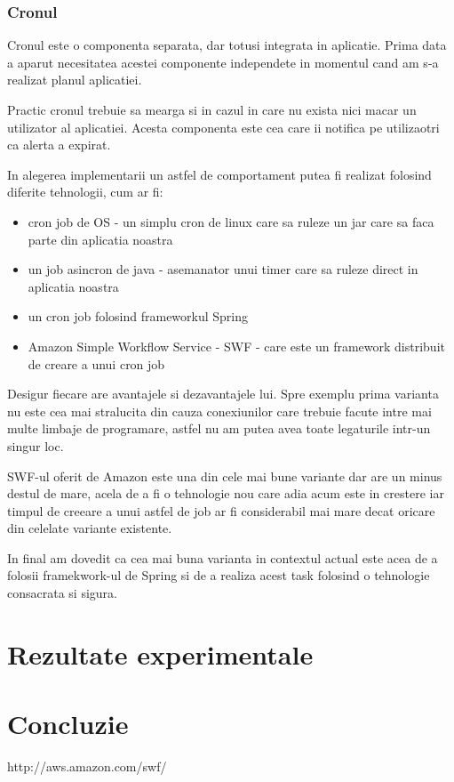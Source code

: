 \documentclass[conference]{IEEEtran}
\begin{document}
\subsubsection{Cronul}

Cronul este o componenta separata, dar totusi integrata in aplicatie. Prima data a aparut necesitatea acestei componente independete in momentul cand am s-a realizat planul aplicatiei. 

Practic cronul trebuie sa mearga si in cazul in care nu exista nici macar un utilizator al aplicatiei. Acesta componenta este cea care ii notifica pe utilizaotri ca alerta a expirat.

In alegerea implementarii un astfel de comportament putea fi realizat folosind diferite tehnologii, cum ar fi:
\begin{itemize}
  \item cron job de OS - un simplu cron de linux care sa ruleze un jar care sa faca parte din aplicatia noastra
  \item un job asincron de java - asemanator unui timer care sa ruleze direct in aplicatia noastra
  \item un cron job folosind frameworkul Spring
  \item Amazon Simple Workflow Service - SWF - care este un framework distribuit de creare a unui cron job 
\end{itemize}

Desigur fiecare are avantajele si dezavantajele lui. Spre exemplu prima varianta nu este cea mai stralucita din cauza conexiunilor care trebuie facute intre mai multe limbaje de programare, astfel nu am putea avea toate legaturile intr-un singur loc.

SWF-ul oferit de Amazon este una din cele mai bune variante dar are un minus destul de mare, acela de a fi o tehnologie nou care adia acum este in crestere iar timpul de creeare a unui astfel de job ar fi considerabil mai mare decat oricare din celelate variante existente.

In final am dovedit ca cea mai buna varianta in contextul actual este acea de a folosii framekwork-ul de Spring si de a realiza acest task folosind o tehnologie consacrata si sigura.


\section{Rezultate experimentale}
\section{Concluzie}


\begin{thebibliography}{1}
http://aws.amazon.com/swf/
\end{thebibliography}
\end{document}
